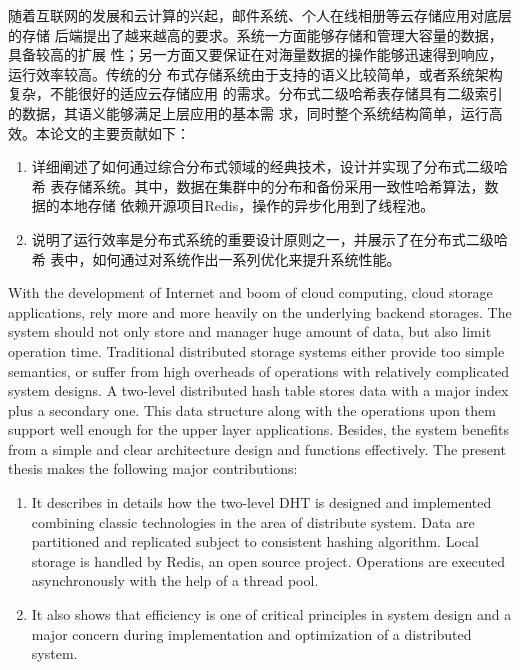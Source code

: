 
\begin{cabstract}
随着互联网的发展和云计算的兴起，邮件系统、个人在线相册等云存储应用对底层的存储
后端提出了越来越高的要求。系统一方面能够存储和管理大容量的数据，具备较高的扩展
性；另一方面又要保证在对海量数据的操作能够迅速得到响应，运行效率较高。传统的分
布式存储系统由于支持的语义比较简单，或者系统架构复杂，不能很好的适应云存储应用
的需求。分布式二级哈希表存储具有二级索引的数据，其语义能够满足上层应用的基本需
求，同时整个系统结构简单，运行高效。本论文的主要贡献如下：
\begin{enumerate}
  \item 详细阐述了如何通过综合分布式领域的经典技术，设计并实现了分布式二级哈希
  表存储系统。其中，数据在集群中的分布和备份采用一致性哈希算法，数据的本地存储
  依赖开源项目Redis，操作的异步化用到了线程池。
  \item 说明了运行效率是分布式系统的重要设计原则之一，并展示了在分布式二级哈希
  表中，如何通过对系统作出一系列优化来提升系统性能。
\end{enumerate}
\end{cabstract}


\begin{eabstract} 
With the development of Internet and boom of cloud computing, cloud storage
applications, rely more and more heavily on the underlying backend storages.
The system should not only store and manager huge amount of data, but also
limit operation time. Traditional distributed storage systems either provide
too simple semantics, or suffer from high overheads of operations with
relatively complicated system designs. A two-level distributed hash table
stores data with a major index plus a secondary one. This data structure along
with the operations upon them support well enough for the upper layer
applications. Besides, the system benefits from a simple and clear
architecture design and functions effectively. The present thesis makes the
following major contributions:
\begin{enumerate}
  \item It describes in details how the two-level DHT is designed and
  implemented combining classic technologies in the area of distribute system.
  Data are partitioned and replicated subject to consistent hashing algorithm.
  Local storage is handled by Redis, an open source project. Operations are
  executed asynchronously with the help of a thread pool.
  \item It also shows that efficiency is one of critical principles in system
  design and a major concern during implementation and optimization of a
  distributed system.
\end{enumerate}
\end{eabstract}

